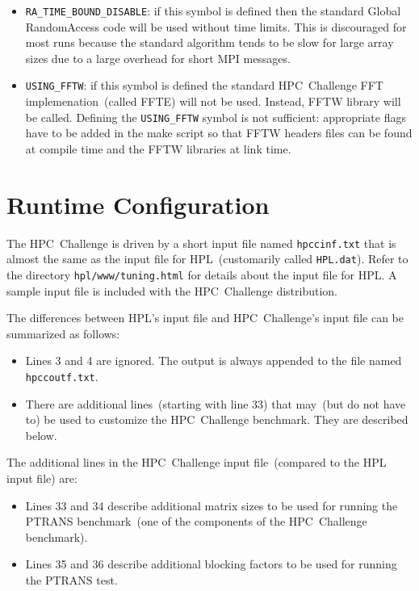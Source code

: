 \documentclass[twocolumn]{article}
\begin{document}
\begin{itemize}
\item \texttt{RA\_TIME\_BOUND\_DISABLE}: if this symbol is defined then the
standard Global RandomAccess code will be used without time limits. This is
discouraged for most runs because the standard algorithm tends to be slow for
large array sizes due to a large overhead for short MPI messages.

\item \texttt{USING\_FFTW}: if this symbol is defined the standard
HPC~Challenge FFT implemenation~(called FFTE) will not be used.
Instead, FFTW library will be called. Defining the
\texttt{USING\_FFTW} symbol is not sufficient: appropriate flags have
to be added in the make script so that FFTW headers files can be found
at compile time and the FFTW libraries at link time.

\end{itemize}

\section{Runtime Configuration}
The HPC~Challenge is driven by a short input file named
\texttt{hpccinf.txt} that is almost the same as the input file for
HPL~(customarily called \texttt{HPL.dat}). Refer to the directory
\texttt{hpl/www/tuning.html} for details about the input file for
HPL. A sample input file is included with the HPC~Challenge
distribution.

The differences between HPL's input file and HPC~Challenge's input
file can be summarized as follows:

\begin{itemize}
\item Lines 3 and 4 are ignored. The output is always appended to the
file named \texttt{hpccoutf.txt}.
\item There are additional lines~(starting with line 33) that may~(but
do not have to) be used to customize the HPC~Challenge benchmark. They
are described below.
\end{itemize}

The additional lines in the HPC~Challenge input file~(compared to the
HPL input file) are:

\begin{itemize}
\item Lines 33 and 34 describe additional matrix sizes to be used for
running the PTRANS benchmark~(one of the components of the
HPC~Challenge benchmark).
\item Lines 35 and 36 describe additional blocking factors to be used
for running the PTRANS test.
\end{itemize}
\end{document}
